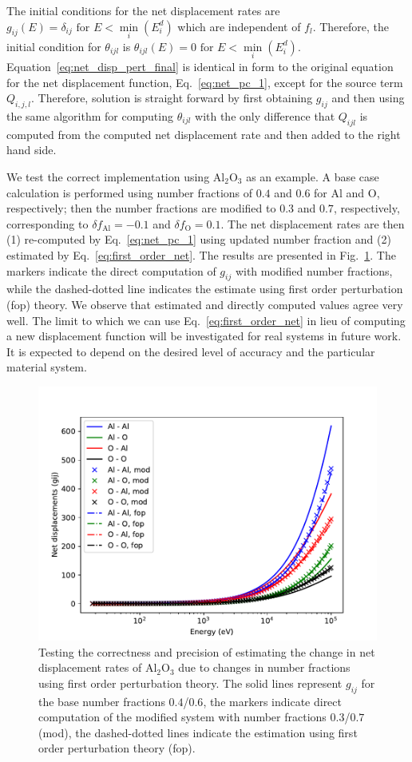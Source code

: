 \documentclass[letterpaper]{mandc2019}
\begin{document}
The initial conditions for the net displacement rates are $g_{ij}(E) = \delta_{ij} \text{ for } E< \min\limits_{i} (E_i^d)$ which are independent of $f_l$. Therefore, the initial condition for $\theta_{ijl}$ is $\theta_{ijl}(E) = 0 \text{ for } E< \min\limits_{i} (E_i^d)$. Equation~\ref{eq:net_disp_pert_final} is identical in form to the original equation for the net displacement function, Eq.~\ref{eq:net_pc_1}, except for the source term $Q_{i,j,l}$. Therefore, solution is straight forward by first obtaining $g_{ij}$ and then using the same algorithm for computing $\theta_{ijl}$ with the only difference that $Q_{ijl}$ is computed from the computed net displacement rate and then added to the right hand side.

We test the correct implementation using $\text{Al}_2\text{O}_3$ as an example. A base case calculation is performed using number fractions of $0.4$ and $0.6$ for Al and O, respectively; then the number fractions are modified to $0.3$ and $0.7$, respectively, corresponding to $\delta f_{\text{Al}} = -0.1$ and $\delta f_{\text{O}} = 0.1$.  The net displacement rates are then (1) re-computed by Eq.~\ref{eq:net_pc_1} using updated number fraction and (2) estimated by Eq.~\ref{eq:first_order_net}. The results are presented in Fig.~\ref{fig:fop_Al2O3}. The markers indicate the direct computation of $g_{ij}$ with modified number fractions, while the dashed-dotted line indicates the estimate using first order perturbation (fop) theory. We observe that estimated and directly computed values agree very well. The limit to which we can use Eq.~\ref{eq:first_order_net} in lieu of computing a new displacement function will be investigated for real systems in future work. It is expected to depend on the desired level of accuracy and the particular material system.

\begin{figure}[th]
	\centering
	\includegraphics[width=0.7\linewidth]{figures/NRT_first_order_perturbation_theory.pdf}
	\caption{Testing the correctness and precision of estimating the change in net displacement rates of $\text{Al}_2\text{O}_3$ due to changes in number fractions using first order perturbation theory. The solid lines represent $g_{ij}$ for the base number fractions $0.4$/$0.6$, the markers indicate direct computation of the modified system with number fractions $0.3$/$0.7$ (mod), the dashed-dotted lines indicate the estimation using first order perturbation theory (fop).}
	\label{fig:fop_Al2O3}
\end{figure}
\end{document}

